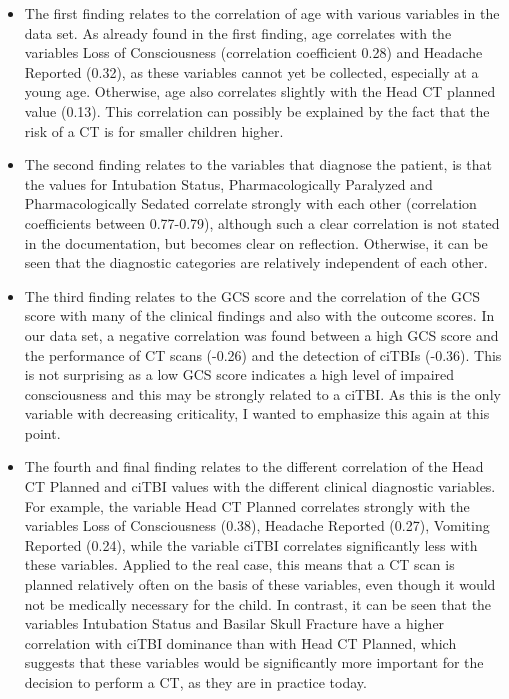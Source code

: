 \documentclass[10pt,letterpaper]{article}
\begin{document}
\begin{itemize}
\item The first finding relates to the correlation of age with various variables in the data set. As already found in the first finding, age correlates with the variables Loss of Consciousness (correlation coefficient 0.28) and Headache Reported (0.32), as these variables cannot yet be collected, especially at a young age. Otherwise, age also correlates slightly with the Head CT planned value (0.13). This correlation can possibly be explained by the fact that the risk of a CT is for smaller children higher.
\item The second finding relates to the variables that diagnose the patient, is that the values for Intubation Status, Pharmacologically Paralyzed and Pharmacologically Sedated correlate strongly with each other (correlation coefficients between 0.77-0.79), although such a clear correlation is not stated in the documentation, but becomes clear on reflection. Otherwise, it can be seen that the diagnostic categories are relatively independent of each other.
\item The third finding relates to the GCS score and the correlation of the GCS score with many of the clinical findings and also with the outcome scores. In our data set, a negative correlation was found between a high GCS score and the performance of CT scans (-0.26) and the detection of ciTBIs (-0.36). This is not surprising as a low GCS score indicates a high level of impaired consciousness and this may be strongly related to a ciTBI. As this is the only variable with decreasing criticality, I wanted to emphasize this again at this point.
\item The fourth and final finding relates to the different correlation of the Head CT Planned and ciTBI values with the different clinical diagnostic variables. For example, the variable Head CT Planned correlates strongly with the variables Loss of Consciousness (0.38), Headache Reported (0.27), Vomiting Reported (0.24), while the variable ciTBI correlates significantly less with these variables. Applied to the real case, this means that a CT scan is planned relatively often on the basis of these variables, even though it would not be medically necessary for the child. In contrast, it can be seen that the variables Intubation Status and Basilar Skull Fracture have a higher correlation with ciTBI dominance than with Head CT Planned, which suggests that these variables would be significantly more important for the decision to perform a CT, as they are in practice today.
\end{itemize}
\end{document}
